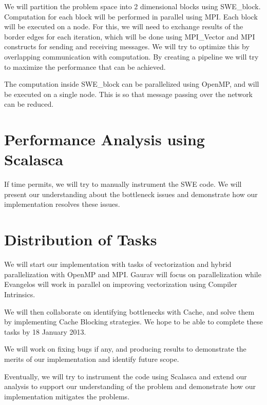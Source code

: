 \documentclass[]{article}
\begin{document}
We will partition the problem space into 2 dimensional blocks using SWE\_block. Computation
for each block will be performed in parallel using MPI. Each block will be executed on a node.
For this, we will need to exchange results of the border edges for each iteration, which will
be done using MPI\_Vector and MPI constructs for sending and receiving messages. We will try
to optimize this by overlapping communication with computation.
By creating a pipeline we will try to maximize the performance that can be achieved.

The computation inside SWE\_block can be parallelized
using OpenMP, and will be executed on a single node. This is so that message passing
over the network can be reduced.  

\section{Performance Analysis using Scalasca}
If time permits, we will try to manually instrument the SWE code. We will present our
understanding about the bottleneck issues and demonstrate how our implementation
resolves these issues.

\section{Distribution of Tasks}
We will start our implementation with tasks of vectorization and hybrid parallelization
with OpenMP and MPI. Gaurav will focus on parallelization while Evangelos will work in parallel
on improving vectorization using Compiler Intrinsics. 

We will then collaborate on identifying bottlenecks with Cache, and solve them by implementing
Cache Blocking strategies. We hope to be able to complete these tasks by 18 January 2013.

We will work on fixing bugs if any, and producing results to demonstrate the merits of our
implementation and identify future scope.

Eventually, we will try to instrument the code using Scalasca and extend our analysis to support
our understanding of the problem and demonstrate how our implementation mitigates the problems.
\end{document}
